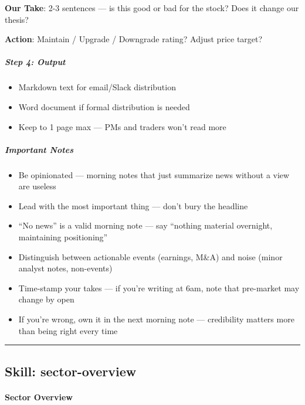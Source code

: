 \documentclass[11pt]{article}
\begin{document}
\textbf{Our Take}: 2-3 sentences — is this good or bad for the stock? Does it change our thesis?


\textbf{Action}: Maintain / Upgrade / Downgrade rating? Adjust price target?


\subparagraph{Step 4: Output}\mbox{}\par

\begin{itemize}[leftmargin=*,itemsep=2pt,topsep=2pt]
\item {} Markdown text for email/Slack distribution
\item {} Word document if formal distribution is needed
\item {} Keep to 1 page max — PMs and traders won't read more
\end{itemize}

\subparagraph{Important Notes}\mbox{}\par

\begin{itemize}[leftmargin=*,itemsep=2pt,topsep=2pt]
\item {} Be opinionated — morning notes that just summarize news without a view are useless
\item {} Lead with the most important thing — don't bury the headline
\item {} ``No news'' is a valid morning note — say ``nothing material overnight, maintaining positioning''
\item {} Distinguish between actionable events (earnings, M\&A) and noise (minor analyst notes, non-events)
\item {} Time-stamp your takes — if you're writing at 6am, note that pre-market may change by open
\item {} If you're wrong, own it in the next morning note — credibility matters more than being right every time
\end{itemize}

\vspace{0.8em}\hrule\vspace{0.8em}

\subsection{Skill: sector-overview}\label{file:skills-sector-overview-SKILL-md}

\paragraph{Sector Overview}\mbox{}\par
\end{document}
